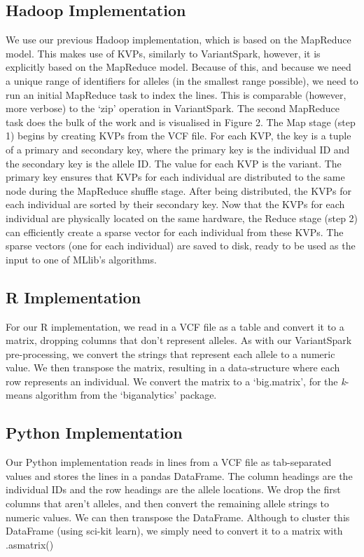 \documentclass{bmcart}
\newcommand{\variantSpark}{{\sc VariantSpark}}
\newcommand{\kMeans}{\textit{k}-means}
\begin{document}
\subsection*{Hadoop Implementation}
We use our previous Hadoop implementation, which is based on the MapReduce model. This makes use of KVPs, similarly to \variantSpark{}, however, it is explicitly based on the MapReduce model.
Because of this, and because we need a unique range of identifiers for alleles (in the smallest range possible), we need to run an initial MapReduce task to index the lines. This is comparable (however, more verbose) to the `zip' operation in \variantSpark{}.
The second MapReduce task does the bulk of the work and is visualised in Figure 2. The Map stage (step 1) begins by creating KVPs from the VCF file. For each KVP, the key is a tuple of a primary and secondary key, where the primary key is the individual ID and the secondary key is the allele ID. The value for each KVP is the variant.
The primary key ensures that KVPs for each individual are distributed to the same node during the MapReduce shuffle stage. After being distributed, the KVPs for each individual are sorted by their secondary key.
Now that the KVPs for each individual are physically located on the same hardware, the Reduce stage (step 2) can efficiently create a sparse vector for each individual from these KVPs. The sparse vectors (one for each individual) are saved to disk, ready to be used as the input to one of MLlib's algorithms.


\subsection*{R Implementation}
For our R implementation, we read in a VCF file as a table and convert it to a matrix, dropping columns that don't represent alleles. As with our \variantSpark{} pre-processing, we convert the strings that represent each allele to a numeric value.
We then transpose the matrix, resulting in a data-structure where each row represents an individual. We convert the matrix to a `big.matrix', for the \kMeans{} algorithm from the `biganalytics' package. 


\subsection*{Python Implementation}
Our Python implementation reads in lines from a VCF file as tab-separated values and stores the lines in a pandas DataFrame. The column headings are the individual IDs and the row headings are the allele locations.
We drop the first columns that aren't alleles, and then convert the remaining allele strings to numeric values. We can then transpose the DataFrame. Although to cluster this DataFrame (using sci-kit learn), we simply need to convert it to a matrix with {\sc .as\textunderscore{}matrix()}
\end{document}
